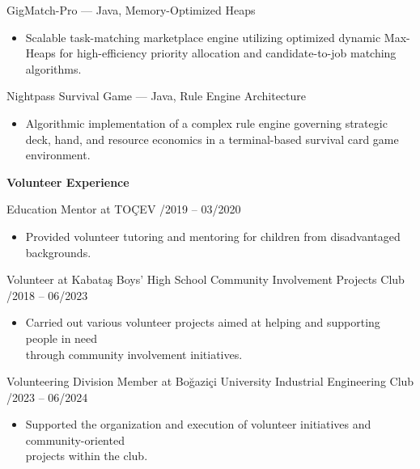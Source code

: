 \documentclass[a4paper]{article}
\newcommand{\sechead}[1]{
    \vspace{10pt}
    {\fontsize{12}{14}\bfseries #1} \par
    \vspace{4pt}
}
\newcommand{\entry}[2]{
    {\fontsize{10}{12}\fontseries{sb}\selectfont #1} \hfill {\fontsize{8}{10}\selectfont #2} \par
}
\newcommand{\desc}[1]{
    {\fontsize{8}{11}\selectfont #1}
}
\begin{document}
\entry{GigMatch-Pro --- \textmd{Java, Memory-Optimized Heaps}}{}
\begin{itemize}[leftmargin=1.1em, itemsep=0pt, parsep=0pt, topsep=1pt]
   \item \desc{Scalable task-matching marketplace engine utilizing optimized dynamic Max-Heaps for high-efficiency priority allocation and candidate-to-job matching algorithms.}
\end{itemize}
\vspace{2pt}

\entry{Nightpass Survival Game --- \textmd{Java, Rule Engine Architecture}}{}
\begin{itemize}[leftmargin=1.1em, itemsep=0pt, parsep=0pt, topsep=1pt]
   \item \desc{Algorithmic implementation of a complex rule engine governing strategic deck, hand, and resource economics in a terminal-based survival card game environment.}
\end{itemize}

\sechead{Volunteer Experience}

\entry{Education Mentor at TO\c{C}EV}{09/2019 -- 03/2020}
\begin{itemize}[leftmargin=1.1em, itemsep=0pt, parsep=0pt, topsep=2pt]
   \item \desc{Provided volunteer tutoring and mentoring for children from disadvantaged backgrounds.}
\end{itemize}
\vspace{2pt}

\entry{Volunteer at Kabata\c{s} Boys' High School Community Involvement Projects Club}{09/2018 -- 06/2023}
\begin{itemize}[leftmargin=1.1em, itemsep=0pt, parsep=0pt, topsep=2pt]
   \item \desc{Carried out various volunteer projects aimed at helping and supporting people in need\\ through community involvement initiatives.}
\end{itemize}
\vspace{2pt}

\entry{Volunteering Division Member at Bo\u{g}azi\c{c}i University Industrial Engineering Club}{09/2023 -- 06/2024}
\begin{itemize}[leftmargin=1.1em, itemsep=0pt, parsep=0pt, topsep=2pt]
   \item \desc{Supported the organization and execution of volunteer initiatives and community-oriented\\ projects within the club.}
\end{itemize}
\vspace{2pt}
\end{document}
